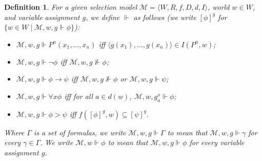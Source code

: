 \documentclass[12pt]{article}
\newtheorem{definition}{Definition}
\newcommand{\tup}[1]{\langle #1 \rangle}
\newcommand{\would}{\mathbin{>}}
\newcommand{\then}{\mathbin{\rightarrow}}
\renewcommand{\iff}{\mathbin{\leftrightarrow}}
\begin{document}
\begin{definition}
\label{Definition:Satisfaction}
    For a given selection model $\mathcal{M} = \tup{W,R,f,D,d,I}$, world $w\in W$, and variable assignment $g$, we define $\Vdash$ as follows (we write $[\phi]^{g}$ for $\{w\in W \mid \mathcal{M},w,g \Vdash \phi\}$):    
    \begin{itemize}
        \item[At.] $\mathcal{M},w,g \Vdash P^{n}(x_1,\dots,x_n)$ iff $\tup{g(x_1),\dots,g(x_n)}\in I(P^{n},w)$;
        \item[$\neg$.] $\mathcal{M},w,g \Vdash \neg\phi$ iff $\mathcal{M},w,g\not\Vdash \phi$;
        \item[$\then$.] $\mathcal{M},w,g \Vdash \phi\then\psi$ iff $\mathcal{M},w,g\not\Vdash \phi$ or $\mathcal{M},w,g \Vdash \psi$;
        \item[$\forall$.] $\mathcal{M},w,g \Vdash \forall{x}\phi$ iff for all $a \in d(w)$, $\mathcal{M},w,g^x_a \Vdash \phi$;
        \item[$\would$.] $\mathcal{M},w,g \Vdash \phi \would \psi$ iff $f([\phi]^{g},w)\subseteq[\psi]^{g}$.
    \end{itemize}
    Where $\Gamma$ is a set of formulas, we write $\mathcal{M},w,g \Vdash \Gamma$ to mean that $\mathcal{M},w,g \Vdash \gamma$ for every $\gamma\in\Gamma$. 
    We write $\mathcal{M},w \Vdash \phi$ to mean that $\mathcal{M},w,g \Vdash \phi$ for every variable assignment $g$. 
\end{definition}

\end{document}
